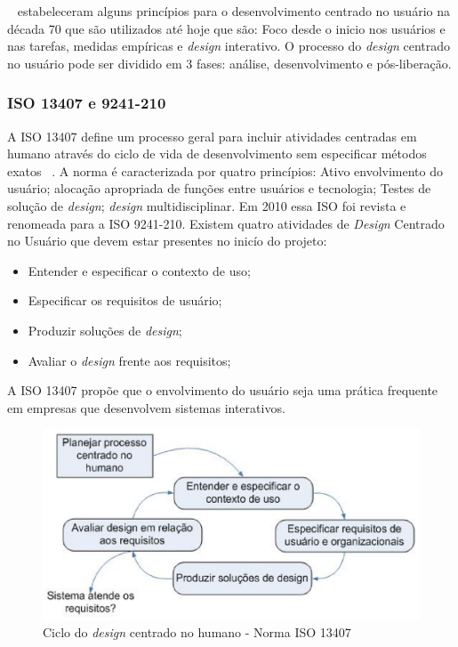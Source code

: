 ~ estabeleceram alguns princípios para o desenvolvimento centrado no usuário na década 70 que são utilizados até hoje que são: Foco desde o inicio nos usuários e nas tarefas, medidas empíricas e \emph{design} interativo. O processo do \emph{design} centrado no usuário pode ser dividido em 3 fases: análise, desenvolvimento e pós-liberação. 


\subsubsection{ISO 13407 e 9241-210}
	
A ISO 13407 define um processo geral para incluir atividades centradas em humano através do ciclo de vida de desenvolvimento sem especificar métodos exatos ~\cite{santos2012}.
%
A norma é caracterizada por quatro princípios: Ativo envolvimento do usuário; alocação apropriada de funções entre usuários e tecnologia; Testes de solução de \emph{design}; \emph{design} multidisciplinar. Em 2010 essa ISO foi revista e renomeada para a ISO 9241-210.
%
Existem quatro atividades de \emph{Design} Centrado no Usuário que devem estar presentes no inicío do projeto:

\begin{itemize}
\item Entender e especificar o contexto de uso;
\item Especificar os requisitos de usuário;
\item Produzir soluções de \emph{design};
\item Avaliar o \emph{design} frente aos requisitos;
\end{itemize}

A ISO 13407 propõe que o envolvimento do usuário seja uma prática frequente em empresas que desenvolvem sistemas interativos.

\begin{figure}[h]
    \centering
    \includegraphics[keepaspectratio=true,scale=0.60]
      {figuras/ciclo_iso13407.eps}
    \caption{Ciclo do \emph{design} centrado no humano - Norma ISO 13407}
    \label{ciclo_iso13407}
\end{figure}


